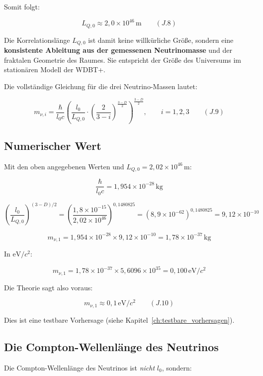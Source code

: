 Somit folgt:

\[
\boxed{L_{Q,0} \approx 2{,}0 \times 10^{46}\,\text{m}} \qquad (J.8)
\]

Die Korrelationslänge \( L_{Q,0} \) ist damit keine willkürliche Größe, sondern eine \textbf{konsistente Ableitung aus der gemessenen Neutrinomasse} und der fraktalen Geometrie des Raumes. Sie entspricht der Größe des Universums im stationären Modell der WDBT+.

Die vollständige Gleichung für die drei Neutrino-Massen lautet:

\[
\boxed{m_{\nu,i} = \frac{\hbar}{l_0 c} \left( \frac{l_0}{L_{Q,0}} \cdot \left(\frac{2}{3-i}\right)^{\frac{3-D}{2}} \right)^{\frac{3-D}{2}}}, \qquad i = 1,2,3 \qquad (J.9)
\]

\subsection{Numerischer Wert}
\label{sub:neutrino_oszillation_numerisch}

Mit den oben angegebenen Werten und \( L_{Q,0} = 2{,}02 \times 10^{46}\,\text{m} \):

\[
\frac{\hbar}{l_0 c} = 1{,}954 \times 10^{-28} \, \text{kg}
\]

\[
\left( \frac{l_0}{L_{Q,0}} \right)^{(3-D)/2} 
= \left( \frac{1{,}8 \times 10^{-15}}{2{,}02 \times 10^{46}} \right)^{0{,}1480825} 
= (8{,}9 \times 10^{-62})^{0{,}1480825} = 9{,}12 \times 10^{-10}
\]

\[
m_{\nu,1} = 1{,}954 \times 10^{-28} \times 9{,}12 \times 10^{-10} 
= 1{,}78 \times 10^{-37} \, \text{kg}
\]

In \( \text{eV}/c^2 \):

\[
m_{\nu,1} = 1{,}78 \times 10^{-37} \times 5{,}6096 \times 10^{35} 
= 0{,}100 \, \text{eV}/c^2
\]

Die Theorie sagt also voraus:

\[
\boxed{m_{\nu,1} \approx 0{,}1 \, \text{eV}/c^2} \qquad (J.10)
\]

Dies ist eine testbare Vorhersage (siehe Kapitel~\ref{ch:testbare_vorhersagen}).

\subsection{Die Compton-Wellenlänge des Neutrinos}
\label{sub:neutrino_oszillation_compton}

Die Compton-Wellenlänge des Neutrinos ist \emph{nicht} \( l_0 \), sondern:

